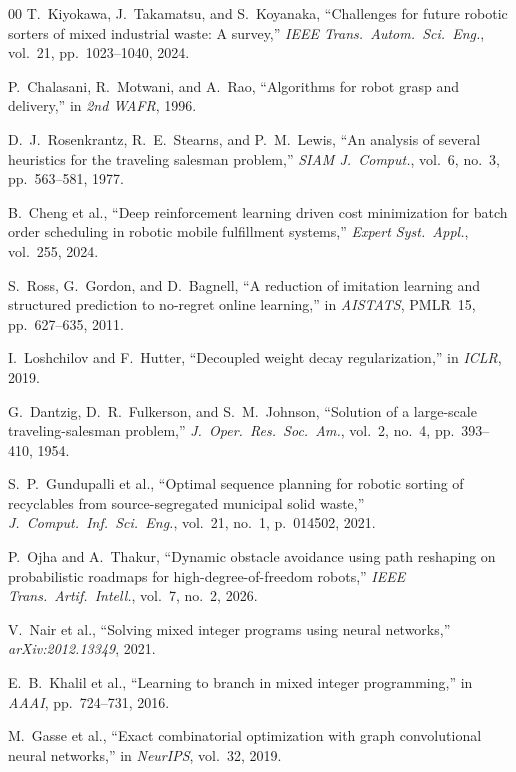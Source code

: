 \documentclass[conference]{IEEEtran}
\begin{document}
\begin{thebibliography}{00}
 T.~Kiyokawa, J.~Takamatsu, and S.~Koyanaka, ``Challenges for future robotic sorters of mixed industrial waste: A survey,'' \emph{IEEE Trans.\ Autom.\ Sci.\ Eng.}, vol.~21, pp.~1023--1040, 2024.

 P.~Chalasani, R.~Motwani, and A.~Rao, ``Algorithms for robot grasp and delivery,'' in \emph{2nd WAFR}, 1996.

 D.~J.~Rosenkrantz, R.~E.~Stearns, and P.~M.~Lewis, ``An analysis of several heuristics for the traveling salesman problem,'' \emph{SIAM J.\ Comput.}, vol.~6, no.~3, pp.~563--581, 1977.

 B.~Cheng et al., ``Deep reinforcement learning driven cost minimization for batch order scheduling in robotic mobile fulfillment systems,'' \emph{Expert Syst.\ Appl.}, vol.~255, 2024.

 S.~Ross, G.~Gordon, and D.~Bagnell, ``A reduction of imitation learning and structured prediction to no-regret online learning,'' in \emph{AISTATS}, PMLR~15, pp.~627--635, 2011.

 I.~Loshchilov and F.~Hutter, ``Decoupled weight decay regularization,'' in \emph{ICLR}, 2019.

 G.~Dantzig, D.~R.~Fulkerson, and S.~M.~Johnson, ``Solution of a large-scale traveling-salesman problem,'' \emph{J.\ Oper.\ Res.\ Soc.\ Am.}, vol.~2, no.~4, pp.~393--410, 1954.

 S.~P.~Gundupalli et al., ``Optimal sequence planning for robotic sorting of recyclables from source-segregated municipal solid waste,'' \emph{J.\ Comput.\ Inf.\ Sci.\ Eng.}, vol.~21, no.~1, p.~014502, 2021.

 P.~Ojha and A.~Thakur, ``Dynamic obstacle avoidance using path reshaping on probabilistic roadmaps for high-degree-of-freedom robots,'' \emph{IEEE Trans.\ Artif.\ Intell.}, vol.~7, no.~2, 2026.

 V.~Nair et al., ``Solving mixed integer programs using neural networks,'' \emph{arXiv:2012.13349}, 2021.

 E.~B.~Khalil et al., ``Learning to branch in mixed integer programming,'' in \emph{AAAI}, pp.~724--731, 2016.

 M.~Gasse et al., ``Exact combinatorial optimization with graph convolutional neural networks,'' in \emph{NeurIPS}, vol.~32, 2019.


\end{thebibliography}
\end{document}

